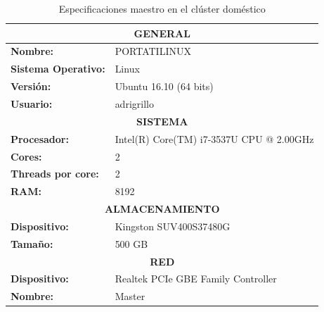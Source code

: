\begin{table}[htp!]
	\centering
	\caption{Especificaciones maestro en el clúster doméstico}
	\label{maestroDomestico}
	\begin{tabular}{|l|l|}
		\hline
		\multicolumn{2}{|c|}{\textbf{GENERAL}}                                 \\ \hline
		\textbf{Nombre:}            & PORTATILINUX                             \\ \hline
		\textbf{Sistema Operativo:} & Linux                                    \\ \hline
		\textbf{Versión:}           & Ubuntu 16.10 (64 bits)                   \\ \hline
		\textbf{Usuario:}           & adrigrillo                               \\ \hline
		\multicolumn{2}{|c|}{\textbf{SISTEMA}}                                 \\ \hline
		\textbf{Procesador:}        & Intel(R) Core(TM) i7-3537U CPU @ 2.00GHz \\ \hline
		\textbf{Cores:}             & 2                                        \\ \hline
		\textbf{Threads por core:}  & 2                                        \\ \hline
		\textbf{RAM:}               & 8192                                     \\ \hline
		\multicolumn{2}{|c|}{\textbf{ALMACENAMIENTO}}                          \\ \hline
		\textbf{Dispositivo:}       & Kingston SUV400S37480G                   \\ \hline
		\textbf{Tamaño:}            & 500 GB                                   \\ \hline
		\multicolumn{2}{|c|}{\textbf{RED}}                                     \\ \hline
		\textbf{Dispositivo:}       & Realtek PCIe GBE Family Controller       \\ \hline
		\textbf{Nombre:}            & Master                                   \\ \hline
	\end{tabular}
\end{table}

